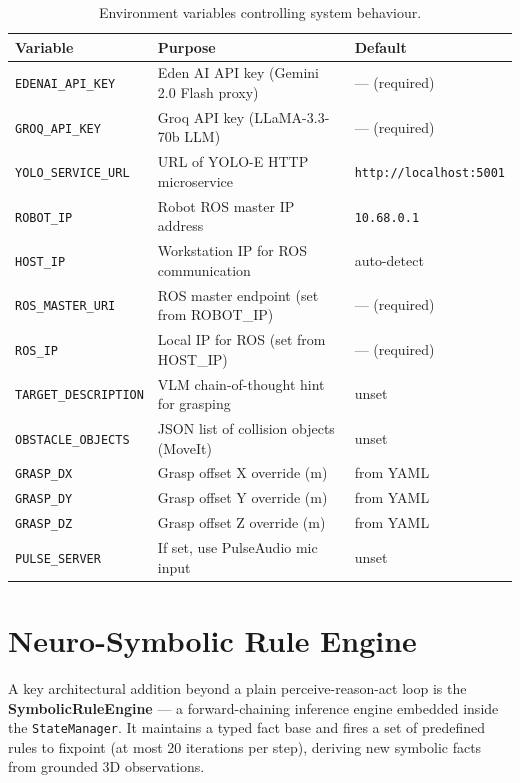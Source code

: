 \begin{table}[H]
\centering
\caption{Environment variables controlling system behaviour.}
\label{tab:env_vars}
\begin{tabularx}{\linewidth}{lXl}
\toprule
\textbf{Variable} & \textbf{Purpose} & \textbf{Default} \\
\midrule
\texttt{EDENAI\_API\_KEY}        & Eden AI API key (Gemini 2.0 Flash proxy) & — (required) \\
\texttt{GROQ\_API\_KEY}         & Groq API key (LLaMA-3.3-70b LLM)        & — (required) \\
\texttt{YOLO\_SERVICE\_URL}     & URL of YOLO-E HTTP microservice          & \texttt{http://localhost:5001} \\
\texttt{ROBOT\_IP}              & Robot ROS master IP address              & \texttt{10.68.0.1} \\
\texttt{HOST\_IP}               & Workstation IP for ROS communication     & auto-detect \\
\texttt{ROS\_MASTER\_URI}       & ROS master endpoint (set from ROBOT\_IP) & — (required) \\
\texttt{ROS\_IP}                & Local IP for ROS (set from HOST\_IP)     & — (required) \\
\texttt{TARGET\_DESCRIPTION}    & VLM chain-of-thought hint for grasping   & unset \\
\texttt{OBSTACLE\_OBJECTS}      & JSON list of collision objects (MoveIt)  & unset \\
\texttt{GRASP\_DX}              & Grasp offset X override (m)              & from YAML \\
\texttt{GRASP\_DY}              & Grasp offset Y override (m)              & from YAML \\
\texttt{GRASP\_DZ}              & Grasp offset Z override (m)              & from YAML \\
\texttt{PULSE\_SERVER}          & If set, use PulseAudio mic input         & unset \\
\bottomrule
\end{tabularx}
\end{table}

\section{Neuro-Symbolic Rule Engine}
\label{sec:rule_engine}

A key architectural addition beyond a plain perceive-reason-act loop is the
\textbf{SymbolicRuleEngine} — a forward-chaining inference engine embedded
inside the \texttt{StateManager}.
It maintains a typed fact base and fires a set of predefined rules to fixpoint
(at most 20 iterations per step), deriving new symbolic facts from grounded
3D observations.

